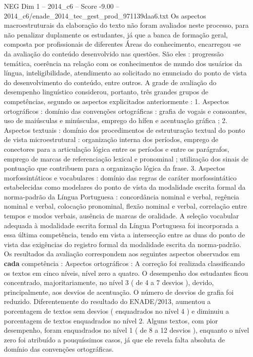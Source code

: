 \begin{textsample}{NEG Dim 1 – 2014\_c6 – Score -9.00 – 2014\_c6/enade\_2014\_tec\_gest\_prod\_971139daa6.txt}
Os aspectos macroestruturais da elaboração do texto não foram avaliados neste processo, para não penalizar duplamente os estudantes, já que a banca de formação geral, composta por profissionais de diferentes Áreas do conhecimento, encarregou -se da avaliação do conteúdo desenvolvido nas questões.
São eles : progressão temática, coerência na relação com os conhecimentos de mundo dos usuários da língua, inteligibilidade, atendimento ao solicitado no enunciado do ponto de vista do desenvolvimento do conteúdo, entre outros.
A grade de avaliação do desempenho linguístico considerou, portanto, três grandes grupos de competências, segundo os aspectos explicitados anteriormente : 1.
Aspectos ortográficos : domínio das convenções ortográficas : grafia de vogais e consoantes, uso de maiúsculas e minúsculas, emprego do hífen e acentuação gráfica ; 2.
Aspectos textuais : domínio dos procedimentos de estruturação textual do ponto de vista microestrutural : organização interna dos períodos, emprego de conectores para a articulação lógica entre os períodos e entre os parágrafos, emprego de marcas de referenciação lexical e pronominal ; utilização dos sinais de pontuação que contribuem para a organização lógica da frase. 3.
Aspectos morfossintáticos e vocabulares : domínio das regras de caráter morfossintático estabelecidas como modelares do ponto de vista da modalidade escrita formal da norma-padrão da Língua Portuguesa : concordância nominal e verbal, regência nominal e verbal, colocação pronominal, flexão nominal e verbal, correlação entre tempos e modos verbais, ausência de marcas de oralidade.
A seleção vocabular adequada à modalidade escrita formal da Língua Portuguesa foi incorporada a essa última competência, tendo em vista a intersecção entre as duas do ponto de vista das exigências do registro formal da modalidade escrita da norma-padrão.
Os resultados da avaliação correspondem aos seguintes aspectos observados em \textbf{cada} competência : Aspectos ortográficos : A correção foi realizada classificando os textos em cinco níveis, nível zero a quatro.
O desempenho dos estudantes ficou concentrado, majoritariamente, no nível 3 ( de 4 a 7 desvios ), devido, principalmente, aos desvios de acentuação.
O número de desvios de grafia foi reduzido.
Diferentemente do resultado do ENADE/2013, aumentou a porcentagem de textos sem desvios ( enquadrados no nível 4 ) e diminuiu a porcentagem de textos enquadrados no nível 2.
Alguns textos, com pior desempenho, foram enquadrados no nível 1 ( de 8 a 12 desvios ), enquanto o nível zero foi atribuído a pouquíssimos casos, já que ele revela falta absoluta de domínio das convenções ortográficas.

\end{textsample}
